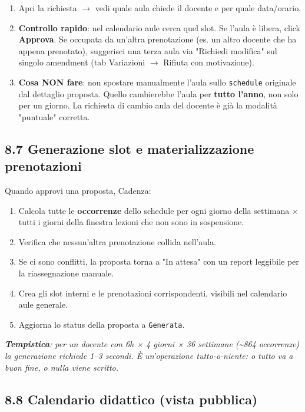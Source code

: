 \documentclass[11pt,a4paper]{article}
\renewenvironment{quote}
  {\begin{list}{}{%
      \setlength{\leftmargin}{8pt}%
      \setlength{\rightmargin}{8pt}%
      \setlength{\topsep}{6pt}%
      \setlength{\parsep}{0pt}}%
      \item\relax\color{black!75}\itshape}
  {\end{list}}
\begin{document}
\begin{enumerate}
  \item Apri la richiesta $\rightarrow$ vedi quale aula chiede il docente e per quale data/orario.
  \item \textbf{Controllo rapido}: nel calendario aule cerca quel slot. Se l'aula è libera, click \textbf{Approva}. Se occupata da un'altra prenotazione (es. un altro docente che ha appena prenotato), suggerisci una terza aula via "Richiedi modifica" sul singolo amendment (tab Variazioni $\rightarrow$ \texttimes{} Rifiuta con motivazione).
  \item \textbf{Cosa NON fare}: non spostare manualmente l'aula sullo \texttt{schedule} originale dal dettaglio proposta. Quello cambierebbe l'aula per \textbf{tutto l'anno}, non solo per un giorno. La richiesta di cambio aula del docente è già la modalità "puntuale" corretta.
\end{enumerate}

\subsection{8.7 Generazione slot e materializzazione prenotazioni}


Quando approvi una proposta, Cadenza:

\begin{enumerate}
  \item Calcola tutte le \textbf{occorrenze} dello schedule per ogni giorno della settimana × tutti i giorni della finestra lezioni che non sono in sospensione.
  \item Verifica che nessun'altra prenotazione collida nell'aula.
  \item Se ci sono conflitti, la proposta torna a "In attesa" con un report leggibile per la riassegnazione manuale.
  \item Crea gli slot interni e le prenotazioni corrispondenti, visibili nel calendario aule generale.
  \item Aggiorna lo status della proposta a \texttt{Generata}.
\end{enumerate}

\begin{quote}
\textbf{Tempistica}: per un docente con 6h × 4 giorni × 36 settimane (\textasciitilde{}864 occorrenze) la generazione richiede 1--3 secondi. È un'operazione tutto-o-niente: o tutto va a buon fine, o nulla viene scritto.
\end{quote}

\subsection{8.8 Calendario didattico (vista pubblica)}
\end{document}
